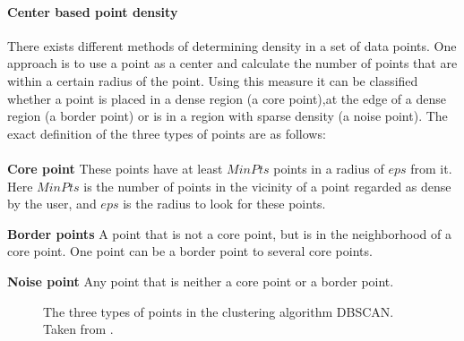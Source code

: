 \paragraph{Center based point density}
There exists different methods of determining density in a set of data points.
One approach is to use a point as a center and calculate the number of points that are within a certain radius of the point.
Using this measure it can be classified whether a point is placed in a dense region (a core point),at the edge of a dense region (a border point) or is in a region with sparse density (a noise point).
The exact definition of the three types of points are as follows\cite{pang2006introduction}:
\\
\\
\noindent
\textbf{Core point} These points have at least $ MinPts $ points in a radius of $ eps $ from it.
Here $ MinPts $ is the number of points in the vicinity of a point regarded as dense by the user, and $ eps $ is the radius to look for these points.

\noindent
\textbf{Border points} A point that is not a core point, but is in the neighborhood of a core point. 
One point can be a border point to several core points.

\noindent
\textbf{Noise point} Any point that is neither a core point or a border point. 

\begin{figure}
\caption{The three types of points in the clustering algorithm DBSCAN. Taken from \cite[page 528]{pang2006introduction}.}
\label{dbscan_point_types}
\end{figure}

